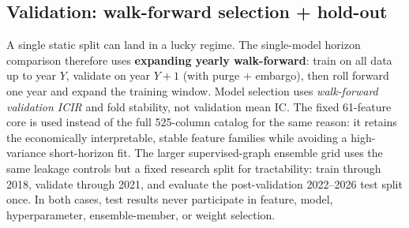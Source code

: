 \documentclass[9pt]{extarticle}
\begin{document}
\subsection{Validation: walk-forward selection + hold-out}
A single static split can land in a lucky regime. The single-model horizon
comparison therefore uses \textbf{expanding yearly walk-forward}: train on all
data up to year $Y$, validate on year $Y{+}1$ (with purge + embargo), then roll
forward one year and expand the training window. Model selection uses
\emph{walk-forward validation ICIR} and fold stability, not validation mean IC.
The fixed 61-feature core is used instead of the full 525-column catalog for the
same reason: it retains the economically interpretable, stable feature families
while avoiding a high-variance short-horizon fit. The larger supervised-graph
ensemble grid uses the same leakage controls but a fixed research split for
tractability: train through 2018, validate through 2021, and evaluate the
post-validation 2022--2026 test split once. In both cases, test results never
participate in feature, model, hyperparameter, ensemble-member, or weight
selection.
\end{document}
